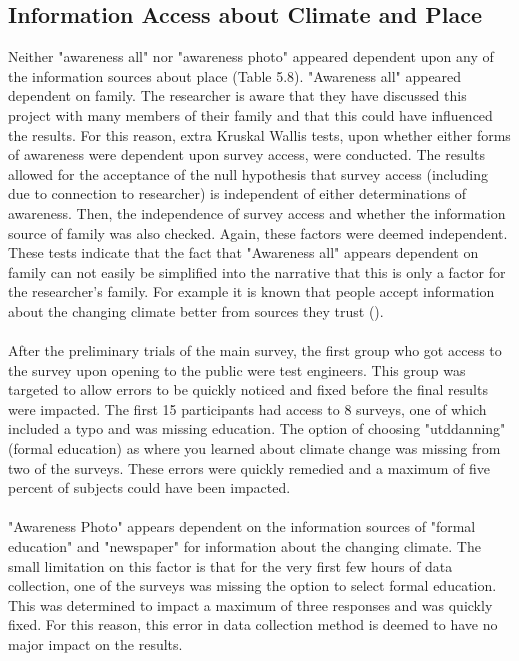 \subsection{Information Access about Climate and Place}
Neither "awareness all" nor "awareness photo" appeared dependent upon any of the information sources about place  (Table 5.8). "Awareness all" appeared dependent on family. The researcher is aware that they have discussed this project with many members of their family and that this could have influenced the results. For this reason, extra Kruskal Wallis tests, upon whether either forms of awareness were dependent upon survey access, were conducted. The results allowed for the acceptance of the null hypothesis that survey access (including due to connection to researcher) is independent of either determinations of awareness. Then, the independence of survey access and whether the information source of family was also checked. Again, these factors were deemed independent. These tests indicate that the fact that "Awareness all" appears dependent on family can not easily be simplified into the narrative that this is only a factor for the researcher's family. For example it is known that people accept information about the changing climate better from sources they trust (\cite{corner_a_principles_2018}). 
\paragraph{}
After the preliminary trials of the main survey, the first group who got access to the survey upon opening to the public were test engineers. This group was targeted to allow errors to be quickly noticed and fixed before the final results were impacted. The first 15 participants had access to 8 surveys, one of which included a typo and was missing education. The option of choosing "utddanning" (formal education) as where you learned about climate change was missing from two of the surveys. These errors were quickly remedied and a maximum of five percent of subjects could have been impacted. 
\paragraph{}
"Awareness Photo" appears dependent on the information sources of "formal education" and "newspaper" for information about the changing climate. The small limitation on this factor is that for the very first few hours of data collection, one of the surveys was missing the option to select formal education. This was determined to impact a maximum of three responses and was quickly fixed. For this reason, this error in data collection method is deemed to have no major impact on the results. 
